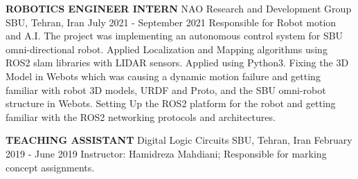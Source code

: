 \begin{cventries}
    \cventry
    {\textbf{ROBOTICS ENGINEER INTERN}}
    {NAO Research and Development Group}
    {SBU, Tehran, Iran}
    {July 2021 - September 2021}
    {Responsible for Robot motion and A.I. 
    \newline The project was implementing an autonomous control system for SBU omni-directional robot. Applied Localization and Mapping algorithms using ROS2 slam libraries with LIDAR sensors. 
    \newline Applied  using Python3. 
    \newline Fixing the 3D Model in Webots which was causing a dynamic motion failure and getting familiar with robot 3D models, URDF and Proto, and the SBU omni-robot structure in Webots. 
    \newline Setting Up the ROS2 platform for the robot and getting familiar with the ROS2 networking protocols and architectures.}
\end{cventries}

\begin{cventries}
    \cventry
    {\textbf{TEACHING ASSISTANT}}
    {Digital Logic Circuits}
    {SBU, Tehran, Iran}
    {February 2019 - June 2019}
    {Instructor: Hamidreza Mahdiani; Responsible for marking concept assignments.}
\end{cventries}